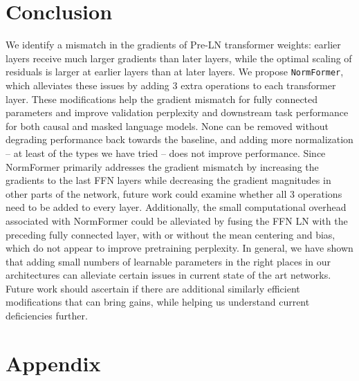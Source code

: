 \documentclass{article} %
\begin{document}
\section{Conclusion}
We identify a mismatch in the gradients of Pre-LN transformer weights: earlier layers receive much larger gradients than later layers, while the optimal scaling of residuals is larger at earlier layers than at later layers. 
We propose \texttt{NormFormer}, which alleviates these issues by adding 3 extra operations to each transformer layer. These modifications help the gradient mismatch for fully connected parameters and improve validation perplexity and downstream task performance for both causal and masked language models. None can be removed without degrading performance back towards the baseline, and adding more normalization -- at least of the types we have tried -- does not improve performance.
Since NormFormer primarily addresses the gradient mismatch by increasing the gradients to the last FFN layers while decreasing the gradient magnitudes in other parts of the network, future work could examine whether all 3 operations need to be added to every layer.
Additionally, the small computational overhead associated with NormFormer could be alleviated by fusing the FFN LN with the preceding fully connected layer, with or without the mean centering and bias, which do not appear to improve pretraining perplexity. 
In general, we have shown that adding small numbers of learnable parameters in the right places in our architectures can alleviate certain issues in current state of the art networks. Future work should ascertain if there are additional similarly efficient modifications that can bring gains, while helping us understand current deficiencies further.

\newpage
\section{Appendix}\label{sec:appendix}
\end{document}
